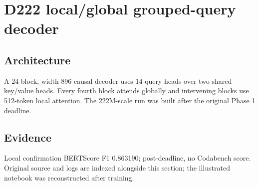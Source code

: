 \section{D222 local/global grouped-query decoder}
\subsection{Architecture} A 24-block, width-896 causal decoder uses 14 query heads over two shared key/value heads. Every fourth block attends globally and intervening blocks use 512-token local attention. The 222M-scale run was built after the original Phase 1 deadline.
\subsection{Evidence} Local confirmation BERTScore F1 0.863190; post-deadline, no Codabench score. Original source and logs are indexed alongside this section; the illustrated notebook was reconstructed after training.
